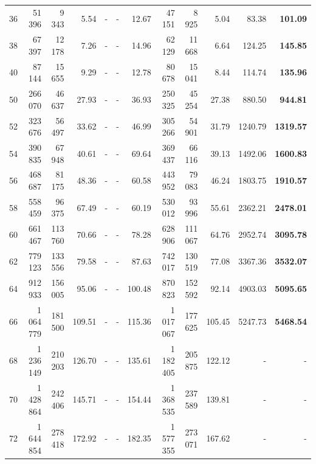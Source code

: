 \documentclass[3p,authoryear,times]{elsarticle}
\begin{document}
{\begin{table}[t]
\begin{center}
\begin{scriptsize}
\begin{tabular}{|c | r | r | r | r |r |r |r |r |r |r |r|}
36	&51 396 	&9 343 	&5.54	&-	&-	&12.67	&47 151 	&8 925	&5.04	&83.38	&\textbf{101.09}\\
38	&67 397 	&12 178	&7.26	&-	&-	&14.96	&62 129 	&11 668 	&6.64	&124.25	&\textbf{145.85}\\
40	&87 144	&15 655 	&9.29	&-	&-	&12.78	&80 678 	&15 041 	&8.44	&114.74	&\textbf{135.96}\\
50	&266 070	&46 637	&27.93	&-	&-	&36.93	&250 325 	&45 254	&27.38	&880.50	&\textbf{944.81}\\
52	&323 676	&56 497	&33.62	&-	&-	&46.99	&305 266 	&54 901	&31.79	&1240.79	&\textbf{1319.57}\\
54	&390 835	&67 948 	&40.61	&-	&-	&69.64	&369 437 	&66 116 	&39.13	&1492.06	&\textbf{1600.83}\\
56	&468 687	&81 175 	&48.36	&-	&-	&60.58	&443 952 	&79 083	&46.24	&1803.75	&\textbf{1910.57}\\
58	&558 459	&96 375 	&67.49	&-	&-	&60.19	&530 012	&93 996 	&55.61	&2362.21	&\textbf{2478.01}\\
60	&661 467	&113 760	&70.66	&-	&-	&78.28	&628 906	&111 067	&64.76	&2952.74	&\textbf{3095.78}\\
62	&779 123	&133 556	&79.58	&-	&-	&87.63	&742 017 	&130 519	&77.08	&3367.36	&\textbf{3532.07}\\
64	&912 933	&156 005	&95.06	&-	&-	&100.48	&870 823 	&152 592 	&92.14	&4903.03	&\textbf{5095.65}\\
66	&1 064 779	&181 500	&109.51	&-	&-	&115.36	&1 017 067 	&177 625	&105.45	&5247.73	&\textbf{5468.54}\\
68	&1 236 149	&210 203 	&126.70	&-	&-	&135.61	&1 182 405 	&205 875 	&122.12	&-	&-\\
70	&1 428 864	&242 406 	&145.71	&-	&-	&154.44	&1 368 535 	&237 589	&139.81	&-	&-\\
72	&1 644 854	&278 418 	&172.92	&-	&-	&182.35	&1 577 355 	&273 071	&167.62	&-	&-\\

\hline
\end{tabular}
\color{black}
\end{scriptsize}
\end{center}
\end{table}
}
\end{document}
